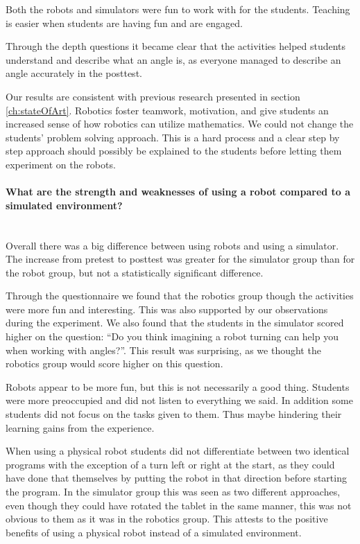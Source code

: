 \bigskip\noindent
Both the robots and simulators were fun to work with for the students. Teaching is easier when students are having fun and are engaged.

\bigskip\noindent
Through the depth questions it became clear that the activities helped students understand and describe what an angle is, as everyone managed to describe an angle accurately in the posttest. 

\bigskip\noindent
Our results are consistent with previous research presented in section \ref{ch:stateOfArt}. Robotics foster teamwork, motivation, and give students an increased sense of how robotics can utilize mathematics. We could not change the students' problem solving approach. This is a hard process and a clear step by step approach should possibly be explained to the students before letting them experiment on the robots. 

\paragraph{What are the strength and weaknesses of using a robot compared to a simulated environment?}~\\
Overall there was a big difference between using robots and using a simulator.
The increase from pretest to posttest was greater for the simulator group than for the robot group, but not a statistically significant difference. 

\bigskip\noindent
Through the questionnaire we found that the robotics group though the activities were more fun and interesting. This was also supported by our observations during the experiment. We also found that the students in the simulator scored higher on the question: ``Do you think imagining a robot turning can help you when working with angles?''. This result was surprising, as we thought the robotics group would score higher on this question.

\bigskip\noindent
Robots appear to be more fun, but this is not necessarily a good thing. Students were more preoccupied and did not listen to everything we said. In addition some students did not focus on the tasks given to them. Thus maybe hindering their learning gains from the experience. 

\bigskip\noindent
When using a physical robot students did not differentiate between two identical programs with the exception of a turn left or right at the start, as they could have done that themselves by putting the robot in that direction before starting the program. In the simulator group this was seen as two different approaches, even though they could have rotated the tablet in the same manner, this was not obvious to them as it was in the robotics group. This attests to the positive benefits of using a physical robot instead of a simulated environment. 
